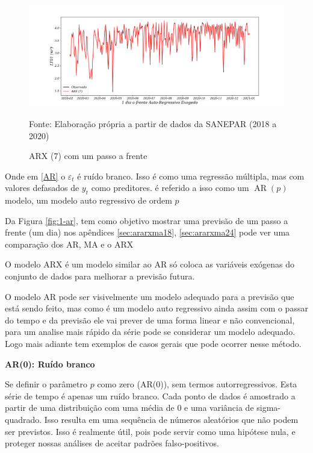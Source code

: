 \begin{figure}[H]
	\centering
	\caption{ARX (7) com um passo a frente}
	\label{fig:1-arx}
	\includegraphics[width=1\linewidth]{Modelos/Figuras/1-ARX}
	
	Fonte: Elaboração própria a partir de dados da SANEPAR (2018 a 2020)
\end{figure}



Onde em \eqref{AR} o $\varepsilon_t$ é ruído branco. Isso é como uma regressão múltipla, mas com valores defasados de $y_t$ como preditores. é referido a isso como um $\operatorname{AR}(p)$ modelo, um modelo auto regressivo de ordem $p$

Da Figura \ref{fig:1-ar}, tem como objetivo mostrar uma previsão de um passo a frente (um dia) nos apêndices \ref{sec:ararxma18}, \ref{sec:ararxma24} pode ver uma comparação dos AR, MA e o ARX

O modelo ARX é um modelo similar ao AR só coloca as variáveis exógenas do conjunto de dados para melhorar a previsão futura.

O modelo AR pode ser visivelmente um modelo adequado para a previsão que está sendo feito, mas como é um modelo auto regressivo ainda assim com o passar do tempo e da previsão ele vai prever de uma forma linear e não convencional, para um analise mais rápido da série pode se considerar um modelo adequado. Logo mais adiante tem exemplos de casos gerais que pode ocorrer nesse método.

\textbf{AR(0): Ruído branco}

Se definir o parâmetro $p$ como zero (AR($0$)), sem termos autorregressivos. Esta série de tempo é apenas um ruído branco. Cada ponto de dados é amostrado a partir de uma distribuição com uma média de $0$ e uma variância de sigma-quadrado. Isso resulta em uma sequência de números aleatórios que não podem ser previstos. Isso é realmente útil, pois pode servir como uma hipótese nula, e proteger nossas análises de aceitar padrões falso-positivos.

